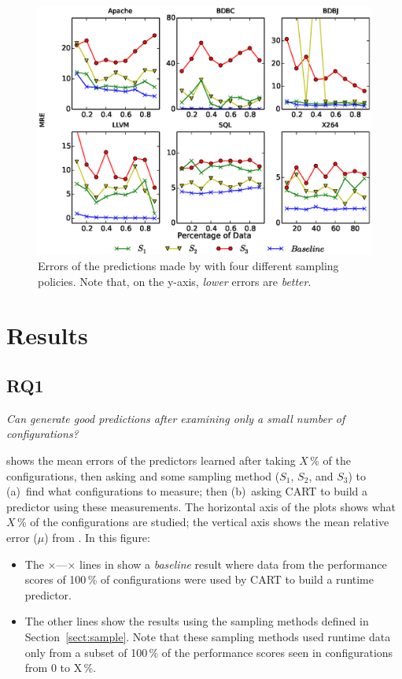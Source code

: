 \begin{figure}[t]
\centering
\includegraphics[width=\columnwidth]{Figures/SamplingAccuracy}
\caption{Errors of the predictions made by \what with four different
sampling policies. Note that, on the y-axis,  {\em lower} errors are {\em better}.
}
\label{fig:sampling_accuracy}
\end{figure}

\section{Results}
\subsection{RQ1}

\begin{center}
{\em Can  \what generate good predictions after
examining only a small number of configurations?}
\end{center}

\noindent {} shows the mean errors of the predictors learned
after taking $X$\,\% of the configurations, then asking  \what and some sampling method ($S_1$, $S_2$, and $S_3$)
to (a)~find what configurations to measure; then (b)~asking CART to build a predictor
using these measurements. The horizontal axis of the plots shows what $X$\,\%
of the configurations are studied; the vertical axis shows the mean relative error ($\mu$) from .
In this figure:
\begin{itemize}
\item
The $\times$\hspace{-2pt}---\hspace{-2pt}$\times$ lines in  show a {\em baseline} result
where data from the performance scores of 100\,\% of  configurations were used by CART
to build a runtime predictor.
\item
The other lines show the results using the sampling methods defined in Section~\ref{sect:sample}.
Note that these sampling methods used  runtime data only from a
subset of 100\,\% of the performance scores seen in configurations
from 0 to X\,\%.
\end{itemize}

